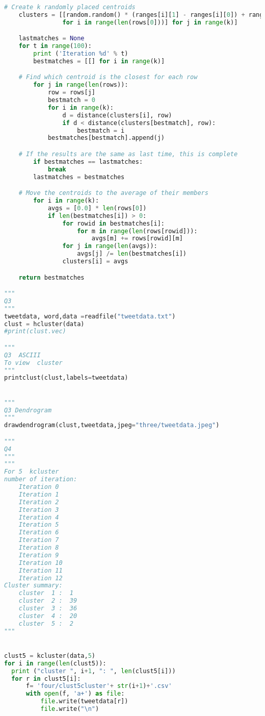 \documentclass[12pt]{article}
\begin{document}
\begin{lstlisting}[language=Python, caption=three.py , label=2nd:copy]
  # Create k randomly placed centroids
    clusters = [[random.random() * (ranges[i][1] - ranges[i][0]) + ranges[i][0]
                for i in range(len(rows[0]))] for j in range(k)]

    lastmatches = None
    for t in range(100):
        print ('Iteration %d' % t)
        bestmatches = [[] for i in range(k)]

    # Find which centroid is the closest for each row
        for j in range(len(rows)):
            row = rows[j]
            bestmatch = 0
            for i in range(k):
                d = distance(clusters[i], row)
                if d < distance(clusters[bestmatch], row):
                    bestmatch = i
            bestmatches[bestmatch].append(j)

    # If the results are the same as last time, this is complete
        if bestmatches == lastmatches:
            break
        lastmatches = bestmatches

    # Move the centroids to the average of their members
        for i in range(k):
            avgs = [0.0] * len(rows[0])
            if len(bestmatches[i]) > 0:
                for rowid in bestmatches[i]:
                    for m in range(len(rows[rowid])):
                        avgs[m] += rows[rowid][m]
                for j in range(len(avgs)):
                    avgs[j] /= len(bestmatches[i])
                clusters[i] = avgs

    return bestmatches

"""
Q3 
"""
tweetdata, word,data =readfile("tweetdata.txt")
clust = hcluster(data)
#print(clust.vec)

"""
Q3  ASCIII
To view  cluster
"""
printclust(clust,labels=tweetdata)


"""
Q3 Dendrogram
"""
drawdendrogram(clust,tweetdata,jpeg="three/tweetdata.jpeg")

"""
Q4
"""
"""
For 5  kcluster
number of iteration:
    Iteration 0
    Iteration 1
    Iteration 2
    Iteration 3
    Iteration 4
    Iteration 5
    Iteration 6
    Iteration 7
    Iteration 8
    Iteration 9
    Iteration 10
    Iteration 11
    Iteration 12
Cluster summary:
    cluster  1 :  1
    cluster  2 :  39
    cluster  3 :  36
    cluster  4 :  20
    cluster  5 :  2
"""


clust5 = kcluster(data,5)
for i in range(len(clust5)):
  print ("cluster ", i+1, ": ", len(clust5[i]))
  for r in clust5[i]:
      f= 'four/clust5cluster'+ str(i+1)+'.csv'
      with open(f, 'a+') as file:
          file.write(tweetdata[r])
          file.write("\n")


\end{lstlisting}
\end{document}
